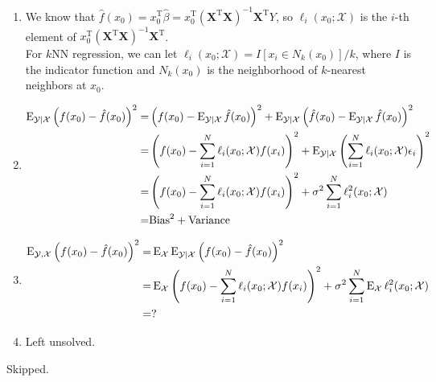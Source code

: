 \begin{sol}
\begin{enumerate}[label={(\alph*)}]
\item 
We know that $\hat{f}(x_0)=x_0^\mathrm{T}\hat{\beta}=x_0^\mathrm{T}(\mathbf{X}^\mathrm{T}\mathbf{X})^{-1}\mathbf{X}^\mathrm{T}Y$, so $\ell_i(x_0;\mathcal{X})$ is the $i$-th element of $x_0^\mathrm{T}(\mathbf{X}^\mathrm{T}\mathbf{X})^{-1}\mathbf{X}^\mathrm{T}$.\\
For $k$NN regression, we can let $\ell_i(x_0;\mathcal{X})=I[x_i\in N_k(x_0)]/k$, where $I$ is the indicator function and $N_k(x_0)$ is the neighborhood of $k$-nearest neighbors at $x_0$.

\item
\begin{align*}
\operatorname{E}_{\mathcal{Y}\vert\mathcal{X}}\left(f(x_0)-\hat{f}(x_0)\right)^2 =& \left(f(x_0)-\operatorname{E}_{\mathcal{Y}\vert\mathcal{X}}\hat{f}(x_0)\right)^2+\operatorname{E}_{\mathcal{Y}\vert\mathcal{X}}\left(\hat{f}(x_0)-\operatorname{E}_{\mathcal{Y}\vert\mathcal{X}}\hat{f}(x_0)\right)^2 \\
=& \left(f(x_0)-\sum_{i=1}^N\ell_i(x_0;\mathcal{X})f(x_i)\right)^2 + \operatorname{E}_{\mathcal{Y}\vert\mathcal{X}}\left(\sum_{i=1}^N\ell_i(x_0;\mathcal{X})\epsilon_i\right)^2 \\
=& \left(f(x_0)-\sum_{i=1}^N\ell_i(x_0;\mathcal{X})f(x_i)\right)^2 + \sigma^2\sum_{i=1}^N\ell_i^2(x_0;\mathcal{X})\\
=& \mathrm{Bias}^2+\mathrm{Variance}
\end{align*}

\item
\begin{align*}
\operatorname{E}_{\mathcal{Y},\mathcal{X}}\left(f(x_0)-\hat{f}(x_0)\right)^2 =& \operatorname{E}_{\mathcal{X}}\operatorname{E}_{\mathcal{Y}\vert\mathcal{X}}\left(f(x_0)-\hat{f}(x_0)\right)^2 \\
=& \operatorname{E}_{\mathcal{X}}\left(f(x_0)-\sum_{i=1}^N\ell_i(x_0;\mathcal{X})f(x_i)\right)^2 + \sigma^2 \sum_{i=1}^N\operatorname{E}_{\mathcal{X}}\ell_i^2(x_0;\mathcal{X}) \\
=& ?
\end{align*}
\item Left unsolved.
\end{enumerate}
\end{sol}

\begin{sol}
Skipped.
\end{sol}

